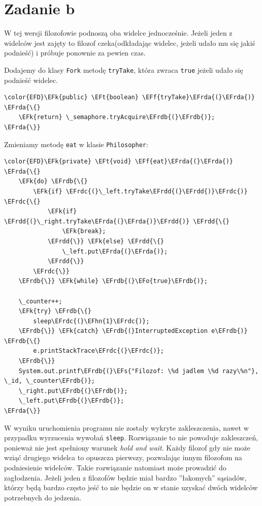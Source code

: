 \documentclass[11pt]{article}
\newcommand{\EFs}[1]{\textcolor{EFs}{#1}} %
\newcommand{\EFk}[1]{\textcolor{EFk}{#1}} %
\newcommand{\EFf}[1]{\textcolor{EFf}{#1}} %
\newcommand{\EFt}[1]{\textcolor{EFt}{#1}} %
\newcommand{\EFo}[1]{\textcolor{EFo}{#1}} %
\newcommand{\EFhn}[1]{\textcolor{EFhn}{#1}} %
\newcommand{\EFrda}[1]{\textcolor{EFrda}{#1}} %
\newcommand{\EFrdb}[1]{\textcolor{EFrdb}{#1}} %
\newcommand{\EFrdc}[1]{\textcolor{EFrdc}{#1}} %
\newcommand{\EFrdd}[1]{\textcolor{EFrdd}{#1}} %
\begin{document}
\section*{Zadanie b}
\label{sec:orgb1a33d5}
W tej wersji filozofowie podnoszą oba widelce jednocześnie.
Jeżeli jeden z widelców jest zajęty to filozof czeka(odkładając widelec, jeżeli
udało mu się jakiś podnieść) i próbuje ponownie za pewien czas.

Dodajemy do klasy \texttt{Fork} metodę \texttt{tryTake}, która zwraca \texttt{true} jeżeli udało się podnieść widelec.
\begin{Code}
\begin{Verbatim}
\color{EFD}\EFk{public} \EFt{boolean} \EFf{tryTake}\EFrda{(}\EFrda{)} \EFrda{\{}
    \EFk{return} \_semaphore.tryAcquire\EFrdb{(}\EFrdb{)};
\EFrda{\}}
\end{Verbatim}
\end{Code}

Zmieniamy metodę \texttt{eat} w klasie \texttt{Philosopher}:
\begin{Code}
\begin{Verbatim}
\color{EFD}\EFk{private} \EFt{void} \EFf{eat}\EFrda{(}\EFrda{)} \EFrda{\{}
    \EFk{do} \EFrdb{\{}
        \EFk{if} \EFrdc{(}\_left.tryTake\EFrdd{(}\EFrdd{)}\EFrdc{)} \EFrdc{\{}
            \EFk{if} \EFrdd{(}\_right.tryTake\EFrda{(}\EFrda{)}\EFrdd{)} \EFrdd{\{}
                \EFk{break};
            \EFrdd{\}} \EFk{else} \EFrdd{\{}
                \_left.put\EFrda{(}\EFrda{)};
            \EFrdd{\}}
        \EFrdc{\}}
    \EFrdb{\}} \EFk{while} \EFrdb{(}\EFo{true}\EFrdb{)};

    \_counter++;
    \EFk{try} \EFrdb{\{}
        sleep\EFrdc{(}\EFhn{1}\EFrdc{)};
    \EFrdb{\}} \EFk{catch} \EFrdb{(}InterruptedException e\EFrdb{)} \EFrdb{\{}
        e.printStackTrace\EFrdc{(}\EFrdc{)};
    \EFrdb{\}}
    System.out.printf\EFrdb{(}\EFs{"Filozof: \%d jadlem \%d razy\%n"}, \_id, \_counter\EFrdb{)};
    \_right.put\EFrdb{(}\EFrdb{)};
    \_left.put\EFrdb{(}\EFrdb{)};
\EFrda{\}}
\end{Verbatim}
\end{Code}

W wyniku uruchomienia programu nie zostały wykryte zakleszczenia, nawet w przypadku wyrzucenia
wywołań \texttt{sleep}.
Rozwiązanie to nie powoduje zakleszczeń, ponieważ nie jest spełniony warunek \emph{hold and wait}.
Każdy filozof gdy nie może wziąć drugiego widelca to opuszcza pierwszy, pozwalając innym filozofom na
podniesienie widelców.
Takie rozwiązanie natomiast może prowadzić do zagłodzenia. Jeżeli jeden z
filozofów będzie miał bardzo ''łakomych'' sąsiadów, którzy będą bardzo często
jeść to nie będzie on w stanie uzyskać dwóch widelców potrzebnych do jedzenia.
\end{document}

